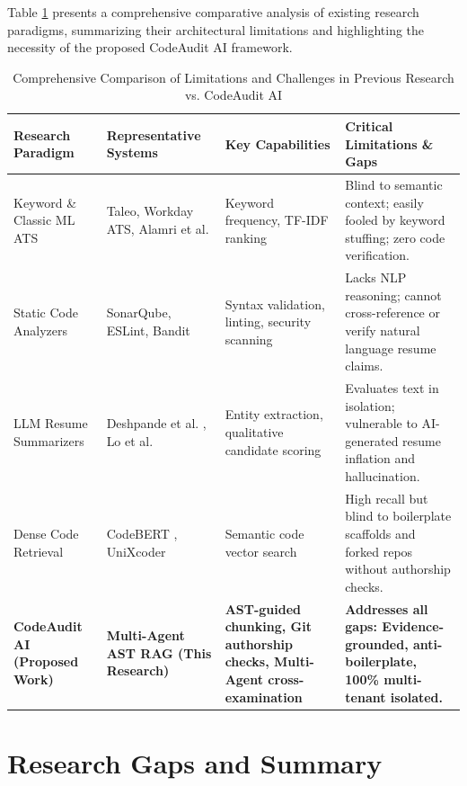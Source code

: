 Table \ref{tab:system_limitations_comparison} presents a comprehensive comparative analysis of existing research paradigms, summarizing their architectural limitations and highlighting the necessity of the proposed CodeAudit AI framework.

\begin{table}[htbp]
\setlength{\tabcolsep}{6pt}
\renewcommand{\arraystretch}{1.3}
\centering
\small
\caption{Comprehensive Comparison of Limitations and Challenges in Previous Research vs. CodeAudit AI}
\label{tab:system_limitations_comparison}
\begin{tabularx}{\textwidth}{@{}p{3.0cm}p{2.8cm}p{3.6cm}p{4.2cm}@{}}
\toprule
\textbf{Research Paradigm} & \textbf{Representative Systems} & \textbf{Key Capabilities} & \textbf{Critical Limitations \& Gaps} \\ \midrule
Keyword \& Classic ML ATS & Taleo, Workday ATS, Alamri et al. \cite{ref1} & Keyword frequency, TF-IDF ranking & Blind to semantic context; easily fooled by keyword stuffing; zero code verification. \\ \midrule
Static Code Analyzers & SonarQube, ESLint, Bandit \cite{ref24, ref36} & Syntax validation, linting, security scanning & Lacks NLP reasoning; cannot cross-reference or verify natural language resume claims. \\ \midrule
LLM Resume Summarizers & Deshpande et al. \cite{ref11}, Lo et al. \cite{ref23} & Entity extraction, qualitative candidate scoring & Evaluates text in isolation; vulnerable to AI-generated resume inflation and hallucination. \\ \midrule
Dense Code Retrieval & CodeBERT \cite{ref37}, UniXcoder \cite{ref50} & Semantic code vector search & High recall but blind to boilerplate scaffolds and forked repos without authorship checks. \\ \midrule
\textbf{CodeAudit AI (Proposed Work)} & \textbf{Multi-Agent AST RAG (This Research)} & \textbf{AST-guided chunking, Git authorship checks, Multi-Agent cross-examination} & \textbf{Addresses all gaps: Evidence-grounded, anti-boilerplate, 100\% multi-tenant isolated.} \\ \bottomrule
\end{tabularx}
\end{table}

\section{Research Gaps and Summary}

